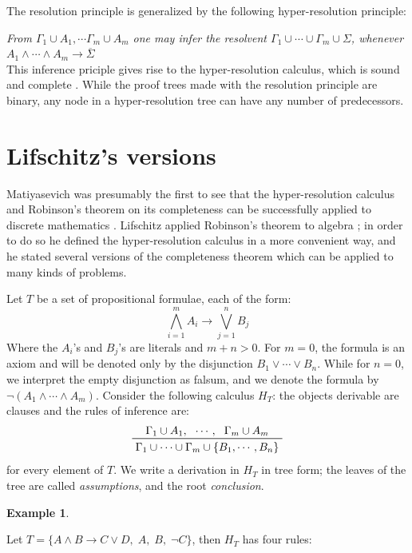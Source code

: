 \documentclass[a4paper,12pt,oneside]{book}
\newtheorem{example}[theorem]{Example}
\let\o\vee
\let\e\wedge
\begin{document}
\newpage\noindent
The resolution principle is generalized by the following hyper-resolution principle:

\textit{From $\Gamma_1\cup A_1,\cdots\Gamma_m\cup A_m $ one may infer the resolvent $\Gamma_1\cup\cdots\cup\Gamma_m\cup \Sigma$, whenever $A_1\e\cdots\e A_m\rightarrow \overline{\Sigma}$}\\  
This inference priciple gives rise to the hyper-resolution calculus, which is sound and complete \cite{rob,robinson-general}. While the proof trees made with the resolution principle are binary, any node in a hyper-resolution tree can have any number of predecessors.


\section{Lifschitz's versions}
Matiyasevich was presumably the first to see that the hyper-resolution calculus and Robinson's theorem on its completeness can be successfully applied to discrete mathematics \cite{mat-1,mat-2}. Lifschitz applied Robinson's theorem to algebra \cite{lifschitz}; in order to do so  he defined the hyper-resolution calculus in a more convenient way, and he stated several versions of the completeness theorem which can be applied to many kinds of problems.

Let $T$ be a set of propositional formulae, each of the form:
\begin{equation}\label{prototipo}
\bigwedge_{i=1}^m A_i \rightarrow \bigvee_{j=1}^n B_j 
\end{equation}
Where the $A_i$'s and $B_j$'s are literals and $m+n>0$. For $m=0$, the formula is an axiom and will be denoted only by the disjunction $B_1\o\cdots\o B_n$. While for $n=0$, we interpret the empty disjunction as falsum, and we denote the formula by $\neg (A_1\e\cdots\e A_m)$.
Consider the following calculus $H_T$: the objects derivable are clauses and the rules of inference are:
\begin{equation}\label{axiom}
\prftree{\Gamma_1 \cup A_1 ,} {\cdots,} {\Gamma_m \cup A_m } 
{\Gamma_1\cup\cdots\cup\Gamma_m\cup\{ B_1 ,\cdots ,B_n\}}
\end{equation}
for every element of $T$. We write a derivation in $H_T$ in tree form; the leaves of the tree are called \textit{assumptions}, and the root \textit{conclusion}.


\noindent\begin{example}
\end{example} Let $T=\{ A \e B \rightarrow C \o D ,\; A,\; B,\; \neg C \}$, then $H_T$ has four rules:
\end{document}
